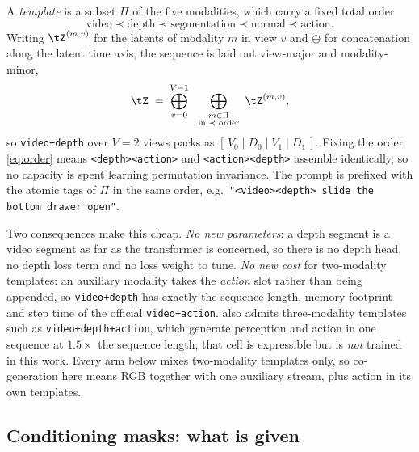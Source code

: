 \documentclass{article} %
\newcommand{\tmpl}[1]{\texttt{#1}}
\newcommand{\ptag}[1]{\texttt{<#1>}}   %
\begin{document}
A \emph{template} is a subset $\Pi$ of the five modalities, which carry a fixed total order
\begin{equation}
\text{video} \prec \text{depth} \prec \text{segmentation} \prec \text{normal} \prec \text{action}.
\label{eq:order}
\end{equation}
Writing $\tZ^{(m,v)}$ for the latents of modality $m$ in view $v$ and $\oplus$ for concatenation
along the latent time axis, the sequence is laid out view-major and modality-minor,
\begin{equation}
\tZ \;=\; \bigoplus_{v=0}^{V-1}\ \ \bigoplus_{\substack{m\in\Pi \\ \text{in } \prec \text{ order}}}\ \tZ^{(m,v)} ,
\label{eq:layout}
\end{equation}
so \tmpl{video+depth} over $V{=}2$ views packs as $[\,V_0\mid D_0\mid V_1\mid D_1\,]$. Fixing the
order \eqref{eq:order} means \ptag{depth}\ptag{action} and \ptag{action}\ptag{depth} assemble
identically, so no capacity is spent learning permutation invariance. The prompt is prefixed with
the atomic tags of $\Pi$ in the same order, e.g.\
\tmpl{"<video><depth> slide the bottom drawer open"}.

Two consequences make this cheap. \emph{No new parameters}: a depth segment is a video segment as
far as the transformer is concerned, so there is no depth head, no depth loss term and no loss
weight to tune. \emph{No new cost} for two-modality templates: an auxiliary modality takes the
\emph{action} slot rather than being appended, so \tmpl{video+depth} has exactly the sequence
length, memory footprint and step time of the official \tmpl{video+action}. \Eqref{eq:layout} also
admits three-modality templates such as \tmpl{video+depth+action}, which generate perception and
action in one sequence at $1.5\times$ the sequence length; that cell is expressible but is
\emph{not} trained in this work. Every arm below mixes two-modality templates only, so
co-generation here means RGB together with one auxiliary stream, plus action in its own templates.

\subsection{Conditioning masks: what is given}
\label{sec:masks}
\end{document}
